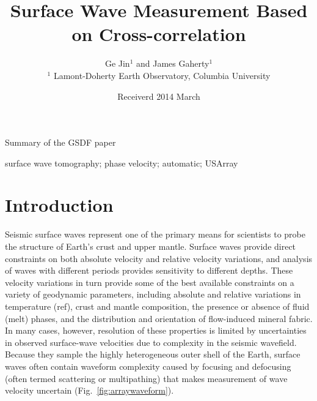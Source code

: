 \documentclass[referee]{gji}
\title[Surface Wave Measurement Based on Cross-correlation]
	{Surface Wave Measurement Based on Cross-correlation}
\author[Ge Jin and James Gaherty]
  {Ge Jin$^1$ and James Gaherty$^1$ \\
  $^1$ Lamont-Doherty Earth Observatory, Columbia University
  }
\date{Receiverd 2014 March}
\begin{document}
\label{firstpage}

\maketitle


\begin{summary}
	Summary of the GSDF paper
\end{summary}

\begin{keywords}
	 surface wave tomography; phase velocity; automatic; USArray
\end{keywords}

\section{Introduction}

Seismic surface waves represent one of the primary means for scientists to probe the structure of Earth's crust and upper mantle.  Surface waves provide direct constraints on both absolute velocity and relative velocity variations, and analysis of waves with different periods provides sensitivity to different depths.  These velocity variations in turn provide some of the best available constraints on a variety of geodynamic parameters, including absolute and relative variations in temperature (ref), crust and mantle composition, the presence or absence of fluid (melt) phases, and the distribution and orientation of flow-induced mineral fabric.  In many cases, however, resolution of these properties is limited by uncertainties in observed surface-wave velocities due to complexity in the seismic wavefield.  Because they sample the highly heterogeneous outer shell of the Earth, surface waves often contain waveform complexity caused by focusing and defocusing (often termed scattering or multipathing) that makes measurement of wave velocity uncertain (Fig.~\ref{fig:arraywaveform}). 
\end{document}
